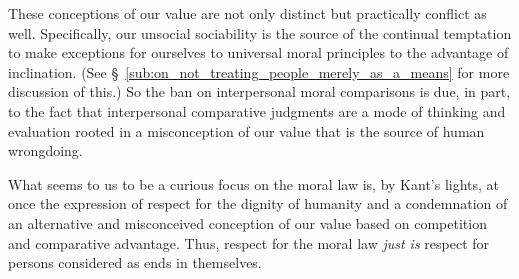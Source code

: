 \documentclass[a4paper,12pt]{article}
\begin{document}
These conceptions of our value are not only distinct but practically conflict as well. Specifically, our unsocial sociability is the source of the continual temptation to make exceptions for ourselves to universal moral principles to the advantage of inclination. (See \S~\ref{sub:on_not_treating_people_merely_as_a_means} for more discussion of this.) So the ban on interpersonal moral comparisons is due, in part, to the fact that interpersonal comparative judgments are a mode of thinking and evaluation rooted in a misconception of our value that is the source of human wrongdoing.

What seems to us to be a curious focus on the moral law is, by Kant's lights, at once the expression of respect for the dignity of humanity and a condemnation of an alternative and misconceived conception of our value based on competition and comparative advantage. Thus, respect for the moral law \emph{just is} respect for persons considered as ends in themselves.
\end{document}
